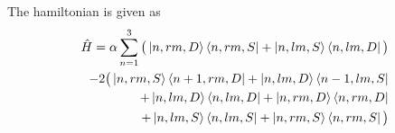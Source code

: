 \documentclass{article}
\begin{document}
The hamiltonian is given as \newline
\begin{equation}
    \begin{split}
        \hat{H} = \alpha \sum_{n=1}^{3} \big( \ket{n, rm, D} \bra{n, rm, S} + \ket{n, lm, S} \bra{n, lm, D} \big) \\
        - 2 \big( \ket{n, rm, S} \bra{n+1, rm, D} + \ket{n, lm, D} \bra{n-1, lm, S} \\
        + \ket{n, lm, D} \bra{n, lm, D} + \ket{n, rm, D} \bra{n, rm, D} \\
        + \ket{n, lm, S} \bra{n, lm, S} + \ket{n, rm, S} \bra{n, rm, S} \big)
    \end{split}
\end{equation}
\end{document}

